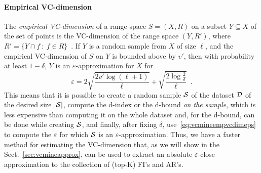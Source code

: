 \paragraph{Empirical VC-dimension} The \emph{empirical
VC-dimension} of a range space $S=(X,R)$ on a subset $Y\subseteq X$ of the set
of points is the VC-dimension of the range space $(Y,R')$, where $R'=\{Y\cap f
~:~ f\in R\}$~\cite[Sect.~3]{BoucheronBL05}. If $Y$ is a random sample from $X$
of size $\ell$, and the empirical VC-dimension of $S$ on $Y$ is bounded above by
$v'$, then with probability at least $1-\delta$, $Y$ is an
$\varepsilon$-approximation for $X$ for 
\begin{equation}\label{eq:vcmineempvcdimeps}
\varepsilon=2\sqrt{\frac{2v'\log(\ell+1)}{\ell}}+\sqrt{\frac{2\log\frac{2}{\delta}}{\ell}}\enspace.
\end{equation}
This means that it is possible to create a random sample ${\cal S}$ of the dataset
${\cal D}$ of the desired size $|{\cal S}|$, compute the d-index or the d-bound \emph{on
the sample}, which is less expensive than computing it on the
whole dataset and, for the d-bound, can be done while creating ${\cal S}$, and
finally, after fixing $\delta$, use~\eqref{eq:vcmineempvcdimeps} to compute the
$\varepsilon$ for which ${\cal S}$ is an $\varepsilon$-approximation. Thus, 
we have a faster method for estimating the VC-dimension that, 
as we
will show in the Sect.~\ref{sec:vcmineapprox}, can be used to extract an absolute
$\varepsilon$-close approximation to the collection of (top-K) FI's and AR's.

